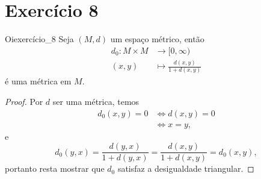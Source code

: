 \section*{Exercício 8}
\begin{proposition}{Oi}{exercício_8}
    Seja \((M, d)\) um espaço métrico, então
    \begin{align*}
        d_0 : M \times M &\to [0, \infty)\\
                   (x,y) &\mapsto \frac{d(x,y)}{1+d(x,y)}
    \end{align*}
    é uma métrica em \(M\).
\end{proposition}
\begin{proof}
    Por \(d\) ser uma métrica, temos
    \begin{align*}
        d_0(x,y) = 0 &\iff d(x,y) = 0\\
                     &\iff x = y,
    \end{align*}
    e
    \begin{equation*}
        d_0(y,x) = \frac{d(y,x)}{1 + d(y,x)} = \frac{d(x,y)}{1+d(x,y)} = d_0(x,y),
    \end{equation*}
    portanto resta mostrar que \(d_0\) satisfaz a desigualdade triangular.

    \todo[Mostremos que a aplicação
    \begin{align*}
        f : [0, \infty) &\to [0, \infty)\\
                    \xi &\mapsto \frac{\xi}{1+\xi}
    \end{align*}
    é crescente.]


\end{proof}
